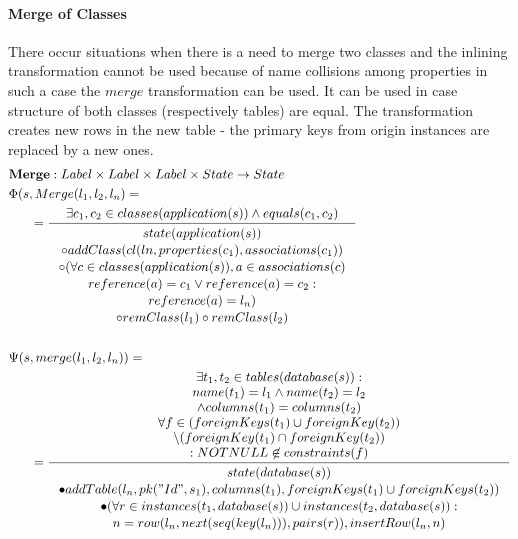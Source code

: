 \documentclass[11pt]{article}
\begin{document}
\paragraph{Merge of Classes} There occur situations when there is a need to merge two classes and the inlining transformation cannot be used because of name collisions among properties in such a case the $merge$ transformation can be used. It can be used in case structure of both classes (respectively tables) are equal. The transformation creates new rows in the new table - the primary keys from origin instances are replaced by a new ones.
\begin{align*}
&	\mathbf{Merge} : Label \times Label \times Label \times State \rightarrow State \\
&	\Phi(s, Merge(l_1, l_2, l_n) = \\
& \;\;\;\;\;\; = \inference{
		\exists c_1, c_2 \in classes(application(s)) \wedge 
		equals(c_1, c_2)}{\begin{gathered}
			state(application(s)) \\ \circ addClass(cl(ln, properties(c_1), associations(c_1)) \\
			\circ (\forall c \in classes (application(s)), a \in associations(c) \\
			reference(a) = c_1 \vee reference(a) = c_2 : \\
			reference(a) = l_n) \\
			\circ remClass(l_1) \circ remClass(l_2) \end{gathered}}
 \\\\
&	\Psi(s, merge(l_1, l_2, l_n)) = \\
& \;\;\;\;\;\; = \inference{\exists t_1, t_2 \in tables(database(s)) : \\ name(t_1) = l_1 \wedge name(t_2) = l_2 \\ \wedge columns(t_1) = columns(t_2)\\
\forall f \in (foreignKeys(t_1) \cup foreignKey(t_2)) \\ \setminus (foreignKey(t_1) \cap foreignKey(t_2)) \\ : NOTNULL \not \in constraints(f)  }{\begin{gathered}
	state(database(s)) \\ \bullet addTable(l_n, pk("Id", s_1), columns(t_1), foreignKeys(t_1) \cup foreignKeys(t_2)  ) \\ 
\bullet (\forall r \in instances(t_1, database(s)) \cup instances(t_2, database(s)) :  \\ n =  row(l_n, next(seq(key(l_n))), pairs(r)), insertRow(l_n, n) \\ 

\end{gathered}}
\end{align*}
\end{document}
